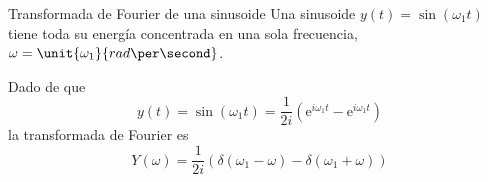 \documentclass[presentation,aspectratio=169]{beamer}
\begin{document}
\begin{frame}[label={sec:orgba005e1}]{Transformada de Fourier de una sinusoide}
Una sinusoide \(y(t) = \sin(\omega_1 t)\) tiene toda su energía concentrada en una sola frecuencia, \(\omega=\unit{\omega_1}{rad\per\second}\). 
\begin{center}
\end{center}
Dado de que \[y(t) = \sin(\omega_1 t) = \frac{1}{2i} \left( \mathrm{e}^{i\omega_1 t} - \mathrm{e}^{i \omega_1 t} \right)\]
la transformada de Fourier es
\[ Y(\omega) = \frac{1}{2i} \left( \delta(\omega_1 - \omega) - \delta(\omega_1 + \omega) \right)\]
\end{frame}
\end{document}
